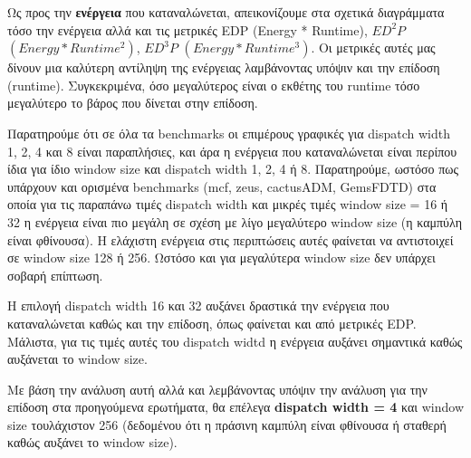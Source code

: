    Ως προς την \textbf{ενέργεια} που καταναλώνεται, απεικονίζουμε στα σχετικά
   διαγράμματα τόσο την ενέργεια αλλά και τις μετρικές EDP (Energy * Runtime),
   $ED^2P$ $(Energy * Runtime^2)$, $ED^3P$ $(Energy * Runtime^3)$. Οι μετρικές
   αυτές μας δίνουν μια καλύτερη αντίληψη της ενέργειας λαμβάνοντας υπόψιν και
   την επίδοση (runtime). Συγκεκριμένα, όσο μεγαλύτερος είναι ο εκθέτης του
   runtime τόσο μεγαλύτερο το βάρος που δίνεται στην επίδοση.
   
   Παρατηρούμε ότι σε όλα τα benchmarks οι επιμέρους γραφικές για dispatch width
   1, 2, 4 και 8 είναι παραπλήσιες, και άρα η ενέργεια που καταναλώνεται είναι
   περίπου ίδια για ίδιο window size και dispatch width  1, 2, 4 ή 8.
   Παρατηρούμε, ωστόσο πως υπάρχουν και ορισμένα benchmarks (mcf, zeus,
   cactusADM, GemsFDTD) στα οποία για τις παραπάνω τιμές dispatch width και
   μικρές τιμές window size = 16 ή 32 η ενέργεια είναι πιο μεγάλη σε σχέση με
   λίγο μεγαλύτερο window size (η καμπύλη είναι φθίνουσα). Η ελάχιστη ενέργεια
   στις περιπτώσεις αυτές φαίνεται να αντιστοιχεί σε window size 128 ή 256.
   Ωστόσο και για μεγαλύτερα window size δεν υπάρχει σοβαρή επίπτωση.
  
   Η επιλογή dispatch width 16 και 32 αυξάνει δραστικά την ενέργεια που
   καταναλώνεται καθώς και την επίδοση, όπως φαίνεται και από μετρικές EDP.
   Mάλιστα, για τις τιμές αυτές του dispatch widtd η ενέργεια αυξάνει
   σημαντικά καθώς αυξάνεται το window size. 
   
   Με βάση την ανάλυση αυτή αλλά και λεμβάνοντας υπόψιν την ανάλυση για την
   επίδοση στα προηγούμενα ερωτήματα, θα επέλεγα \textbf{dispatch width = 4} και
   window size τουλάχιστον 256 (δεδομένου ότι η πράσινη καμπύλη είναι φθίνουσα ή
   σταθερή καθώς αυξάνει το window size).